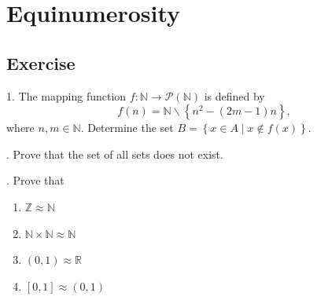 \documentclass[12pt]{article}
\begin{document}
\section{Equinumerosity}
\subsection{Exercise}
	1. The mapping function $f:\mathbb{N} \to \mathcal{P}\left( \mathbb{N} \right)$ is defined by 
		\begin{equation*}
		f\left( n \right) = \mathbb{N}\backslash \left\{ {{n^2} - \left( {2m - 1} \right)n} \right\},
		\end{equation*}
	where $n,m \in \mathbb{N}$. Determine the set $B = \left\{ {x \in A \mid x \not\in f\left( x \right)} \right\}.$
	\par {}. Prove that the set of all sets does not exist.
	\par {}.  Prove that 
	\begin{enumerate}
		\item $\mathbb{Z} \approx \mathbb{N}$
		\item $\mathbb{N} \times \mathbb{N} \approx \mathbb{N}$
		\item $(0,1) \approx \mathbb{R}$
		\item $[0,1] \approx(0,1)$
	\end{enumerate}
\end{document}
